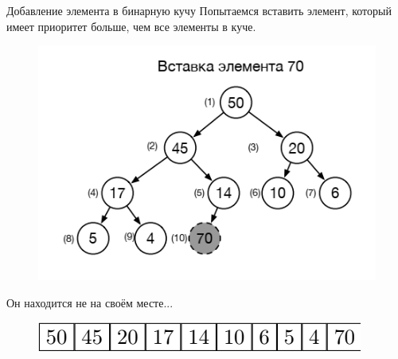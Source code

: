 \documentclass{beamer}
\begin{document}
\begin{frame}{Добавление элемента в бинарную кучу}	
	Попытаемся вставить элемент, который имеет приоритет больше, чем все элементы в куче.
	\begin{figure}[h]
		\centering
		\includegraphics[scale=0.4]{images/lec06-pic09.png}
	\end{figure}
	Он находится не на своём месте... 
	\begin{figure}[h]
		\centering
		\includegraphics[scale=0.5]{images/lec06-pic10.png}
	\end{figure}	
\end{frame}
\end{document}
